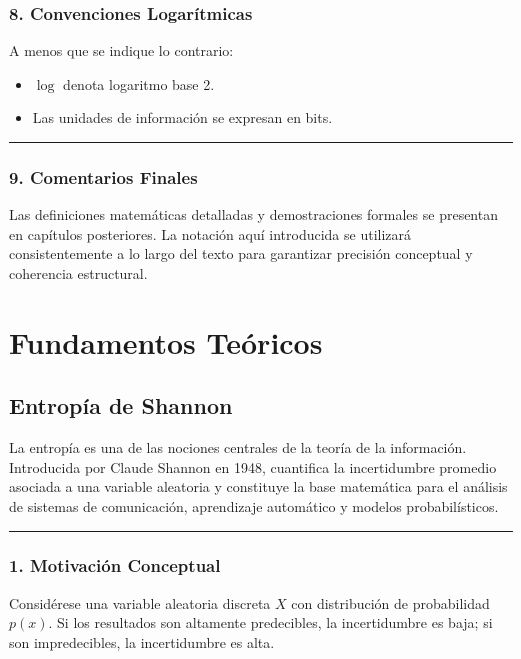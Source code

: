 \documentclass[letterpaper,10pt,english]{jupyterBook}
\begin{document}
\section{8. Convenciones Logarítmicas}
\label{\detokenize{00_frontmatter/notation:convenciones-logaritmicas}}
\sphinxAtStartPar
A menos que se indique lo contrario:
\begin{itemize}
\item {} 
\sphinxAtStartPar
\(\log\) denota logaritmo base 2.

\item {} 
\sphinxAtStartPar
Las unidades de información se expresan en bits.

\end{itemize}


\bigskip\hrule\bigskip



\section{9. Comentarios Finales}
\label{\detokenize{00_frontmatter/notation:comentarios-finales}}
\sphinxAtStartPar
Las definiciones matemáticas detalladas y demostraciones formales se presentan en capítulos posteriores. La notación aquí introducida se utilizará consistentemente a lo largo del texto para garantizar precisión conceptual y coherencia estructural.

\sphinxstepscope


\part{Fundamentos Teóricos}

\sphinxstepscope


\chapter{Entropía de Shannon}
\label{\detokenize{01_theory/entropy:entropia-de-shannon}}\label{\detokenize{01_theory/entropy::doc}}
\sphinxAtStartPar
La entropía es una de las nociones centrales de la teoría de la información. Introducida por Claude Shannon en 1948, cuantifica la incertidumbre promedio asociada a una variable aleatoria y constituye la base matemática para el análisis de sistemas de comunicación, aprendizaje automático y modelos probabilísticos.


\bigskip\hrule\bigskip



\section{1. Motivación Conceptual}
\label{\detokenize{01_theory/entropy:motivacion-conceptual}}
\sphinxAtStartPar
Considérese una variable aleatoria discreta \(X\) con distribución de probabilidad \(p(x)\). Si los resultados son altamente predecibles, la incertidumbre es baja; si son impredecibles, la incertidumbre es alta.
\end{document}
